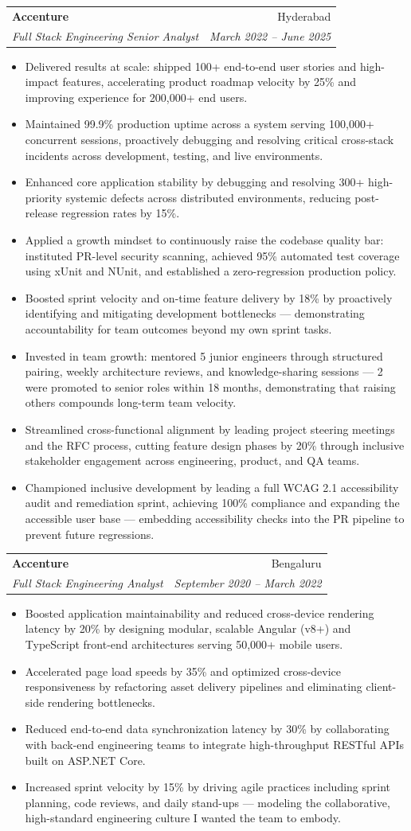 \documentclass[letterpaper,11pt]{article}
\makeatletter
\newcommand{\resumeItem}[1]{\item\small{{#1 \vspace{-2pt}}}}
\newcommand{\resumeSubheading}[4]{
  \vspace{-2pt}\item
    \begin{tabular*}{0.97\textwidth}[t]{l@{\extracolsep{\fill}}r}
      \textbf{#1} & #2 \\
      \textit{\small#3} & \textit{\small #4} \\
    \end{tabular*}\vspace{-7pt}
}
\newcommand{\resumeItemListStart}{\begin{itemize}}
\newcommand{\resumeItemListEnd}{\end{itemize}\vspace{-5pt}}
\makeatother
\begin{document}
    \resumeSubheading
      {Accenture}{Hyderabad}
      {Full Stack Engineering Senior Analyst}{March 2022 -- June 2025}
      \resumeItemListStart
        \resumeItem{Delivered results at scale: shipped 100+ end-to-end user stories and high-impact features, accelerating product roadmap velocity by 25\% and improving experience for 200,000+ end users.}
        \resumeItem{Maintained 99.9\% production uptime across a system serving 100,000+ concurrent sessions, proactively debugging and resolving critical cross-stack incidents across development, testing, and live environments.}
        \resumeItem{Enhanced core application stability by debugging and resolving 300+ high-priority systemic defects across distributed environments, reducing post-release regression rates by 15\%.}
        \resumeItem{Applied a growth mindset to continuously raise the codebase quality bar: instituted PR-level security scanning, achieved 95\% automated test coverage using xUnit and NUnit, and established a zero-regression production policy.}
        \resumeItem{Boosted sprint velocity and on-time feature delivery by 18\% by proactively identifying and mitigating development bottlenecks --- demonstrating accountability for team outcomes beyond my own sprint tasks.}
        \resumeItem{Invested in team growth: mentored 5 junior engineers through structured pairing, weekly architecture reviews, and knowledge-sharing sessions --- 2 were promoted to senior roles within 18 months, demonstrating that raising others compounds long-term team velocity.}
        \resumeItem{Streamlined cross-functional alignment by leading project steering meetings and the RFC process, cutting feature design phases by 20\% through inclusive stakeholder engagement across engineering, product, and QA teams.}
        \resumeItem{Championed inclusive development by leading a full WCAG 2.1 accessibility audit and remediation sprint, achieving 100\% compliance and expanding the accessible user base --- embedding accessibility checks into the PR pipeline to prevent future regressions.}
      \resumeItemListEnd

    \resumeSubheading
      {Accenture}{Bengaluru}
      {Full Stack Engineering Analyst}{September 2020 -- March 2022}
      \resumeItemListStart
        \resumeItem{Boosted application maintainability and reduced cross-device rendering latency by 20\% by designing modular, scalable Angular (v8+) and TypeScript front-end architectures serving 50,000+ mobile users.}
        \resumeItem{Accelerated page load speeds by 35\% and optimized cross-device responsiveness by refactoring asset delivery pipelines and eliminating client-side rendering bottlenecks.}
        \resumeItem{Reduced end-to-end data synchronization latency by 30\% by collaborating with back-end engineering teams to integrate high-throughput RESTful APIs built on ASP.NET Core.}
        \resumeItem{Increased sprint velocity by 15\% by driving agile practices including sprint planning, code reviews, and daily stand-ups --- modeling the collaborative, high-standard engineering culture I wanted the team to embody.}
      \resumeItemListEnd
\end{document}
